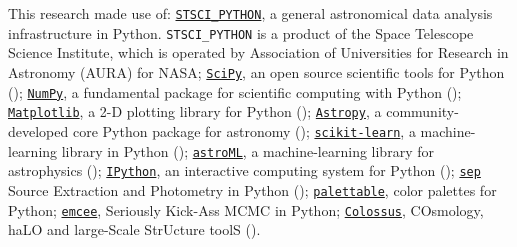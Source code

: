 \documentclass[fleqn,usenatbib]{mnras}
\begin{document}
  This research made use of:
  \href{http://www.stsci.edu/institute/software_hardware/pyraf/stsci\_python}
  {\texttt{\small{STSCI\_PYTHON}}},
      a general astronomical data analysis infrastructure in Python. 
      \texttt{\small{STSCI\_PYTHON}} is a product of the Space Telescope Science
      Institute, which is operated by Association of Universities for Research 
      in Astronomy (AURA) for NASA;
  \href{http://www.scipy.org/}{\texttt{SciPy}},
      an open source scientific tools for Python (\citealt{SciPy});
  \href{http://www.numpy.org/}{\texttt{NumPy}}, 
      a fundamental package for scientific computing with Python (\citealt{NumPy});
  \href{http://matplotlib.org/}{\texttt{Matplotlib}}, 
      a 2-D plotting library for Python (\citealt{Matplotlib});
  \href{http://www.astropy.org/}{\texttt{Astropy}}, a community-developed 
      core Python package for astronomy (\citealt{AstroPy}); 
  \href{http://scikit-learn.org/stable/index.html}{\texttt{scikit-learn}},
      a machine-learning library in Python (\citealt{scikit-learn}); 
  \href{http://www.astroml.org/}{\texttt{astroML}}, 
      a machine-learning library for astrophysics (\citealt{astroML});
  \href{https://ipython.org}{\texttt{IPython}}, 
      an interactive computing system for Python (\citealt{IPython});
  \href{https://github.com/kbarbary/sep}{\texttt{sep}} 
      Source Extraction and Photometry in Python (\citealt{PythonSEP});
  \href{https://jiffyclub.github.io/palettable/}{\texttt{palettable}},
      color palettes for Python;
  \href{http://dan.iel.fm/emcee/current/}{\texttt{emcee}}, 
      Seriously Kick-Ass MCMC in Python;
  \href{http://bdiemer.bitbucket.org/}{\texttt{Colossus}}, 
      COsmology, haLO and large-Scale StrUcture toolS (\citealt{Colossus}).






\appendix
 
\end{document}
